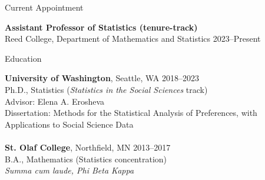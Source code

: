 \documentclass{resume} %
\begin{document}
\begin{rSection}{Current Appointment}

\textbf{Assistant Professor of Statistics (tenure-track)}
\\ Reed College, Department of Mathematics and Statistics \hfill{2023--Present}
\end{rSection}

\begin{rSection}{Education}

\textbf{University of Washington}, Seattle, WA \hfill {2018--2023} 
\\ Ph.D., Statistics ({\it Statistics in the Social Sciences} track)
\\ Advisor: Elena A. Erosheva
\\ Dissertation: Methods for the Statistical Analysis of Preferences, with Applications to Social Science Data
\\
\\\textbf{St. Olaf College}, Northfield, MN \hfill {2013--2017} 
\\ B.A., Mathematics (Statistics concentration)
\\ {\it Summa cum laude, Phi Beta Kappa}
\end{rSection}
\end{document}
